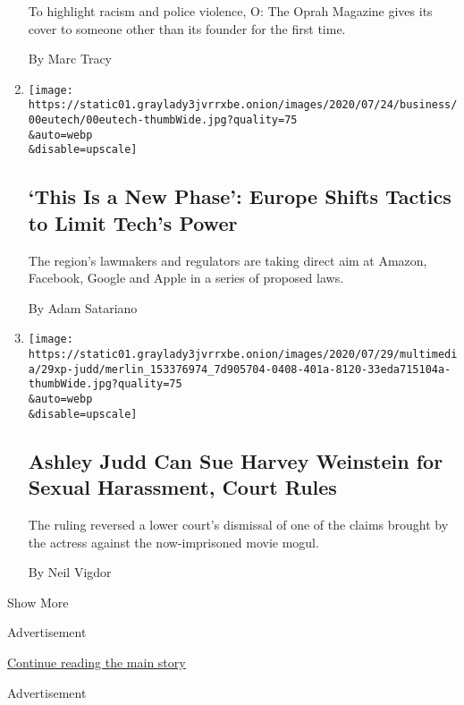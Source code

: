 \begin{enumerate}
  To highlight racism and police violence, O: The Oprah Magazine gives
  its cover to someone other than its founder for the first time.

  By Marc Tracy
\item
  \href{/2020/07/30/technology/europe-new-phase-tech-amazon-apple-facebook-google.html}{}

  \texttt{[image: https://static01.graylady3jvrrxbe.onion/images/2020/07/24/business/00eutech/00eutech-thumbWide.jpg?quality=75\\\&auto=webp\\\&disable=upscale]}

  \hypertarget{this-is-a-new-phase-europe-shifts-tactics-to-limit-techs-power}{%
  \subsection{`This Is a New Phase': Europe Shifts Tactics to Limit
  Tech's
  Power}\label{this-is-a-new-phase-europe-shifts-tactics-to-limit-techs-power}}

  The region's lawmakers and regulators are taking direct aim at Amazon,
  Facebook, Google and Apple in a series of proposed laws.

  By Adam Satariano
\item
  \href{/2020/07/29/business/media/judd-weinstein-lawsuit-appeal.html}{}

  \texttt{[image: https://static01.graylady3jvrrxbe.onion/images/2020/07/29/multimedia/29xp-judd/merlin\_153376974\_7d905704-0408-401a-8120-33eda715104a-thumbWide.jpg?quality=75\\\&auto=webp\\\&disable=upscale]}

  \hypertarget{ashley-judd-can-sue-harvey-weinstein-for-sexual-harassment-court-rules}{%
  \subsection{Ashley Judd Can Sue Harvey Weinstein for Sexual
  Harassment, Court
  Rules}\label{ashley-judd-can-sue-harvey-weinstein-for-sexual-harassment-court-rules}}

  The ruling reversed a lower court's dismissal of one of the claims
  brought by the actress against the now-imprisoned movie mogul.

  By Neil Vigdor
\end{enumerate}

Show More

Advertisement

\protect\hyperlink{after-mid1}{Continue reading the main story}

Advertisement

